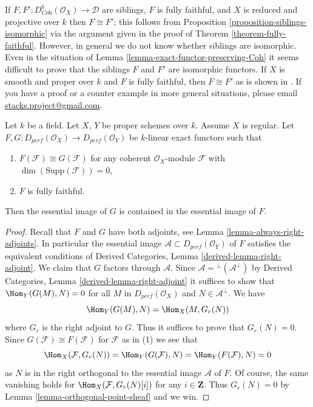 \begin{remark}
\label{remark-difficult}
If $F, F' : D^b_{\textit{Coh}}(\mathcal{O}_X) \to \mathcal{D}$ are siblings, $F$
is fully faithful, and $X$ is reduced and projective over $k$ then
$F \cong F'$; this follows from
Proposition \ref{proposition-siblings-isomorphic} via the argument
given in the proof of Theorem \ref{theorem-fully-faithful}.
However, in general we do not know whether siblings are isomorphic.
Even in the situation of Lemma \ref{lemma-exact-functor-preserving-Coh}
it seems difficult to prove that the siblings $F$ and $F'$
are isomorphic functors. If $X$ is smooth and proper over $k$
and $F$ is fully faithful, then $F \cong F'$ as is shown in
\cite{Noah}.
If you have a proof or a counter example in more general situations,
please email
\href{mailto:stacks.project@gmail.com}{stacks.project@gmail.com}.
\end{remark}

\begin{lemma}
\label{lemma-two-functors-pre}
Let $k$ be a field. Let $X$, $Y$ be proper schemes over $k$. Assume
$X$ is regular. Let
$F, G : D_{perf}(\mathcal{O}_X) \to D_{perf}(\mathcal{O}_Y)$
be $k$-linear exact functors such that
\begin{enumerate}
\item $F(\mathcal{F}) \cong G(\mathcal{F})$ for any coherent
$\mathcal{O}_X$-module $\mathcal{F}$ with $\dim(\text{Supp}(\mathcal{F})) = 0$,
\item $F$ is fully faithful.
\end{enumerate}
Then the essential image of $G$ is contained in the essential
image of $F$.
\end{lemma}

\begin{proof}
Recall that $F$ and $G$ have both adjoints, see
Lemma \ref{lemma-always-right-adjoints}. In particular
the essential image $\mathcal{A} \subset D_{perf}(\mathcal{O}_Y)$ of $F$
satisfies the equivalent conditions of
Derived Categories, Lemma \ref{derived-lemma-right-adjoint}.
We claim that $G$ factors through $\mathcal{A}$.
Since $\mathcal{A} = {}^\perp(\mathcal{A}^\perp)$ by
Derived Categories, Lemma \ref{derived-lemma-right-adjoint}
it suffices to show that $\Hom_Y(G(M), N) = 0$ for
all $M$ in $D_{perf}(\mathcal{O}_X)$ and $N \in \mathcal{A}^\perp$.
We have
$$
\Hom_Y(G(M), N) = \Hom_X(M, G_r(N))
$$
where $G_r$ is the right adjoint to $G$. Thus it suffices to prove
that $G_r(N) = 0$. Since
$G(\mathcal{F}) \cong F(\mathcal{F})$ for $\mathcal{F}$ as in (1)
we see that
$$
\Hom_X(\mathcal{F}, G_r(N)) =
\Hom_Y(G(\mathcal{F}), N) =
\Hom_Y(F(\mathcal{F}), N) = 0
$$
as $N$ is in the right orthogonal to the essential image $\mathcal{A}$ of $F$.
Of course, the same vanishing holds for $\Hom_X(\mathcal{F}, G_r(N)[i])$
for any $i \in \mathbf{Z}$. Thus $G_r(N) = 0$ by
Lemma \ref{lemma-orthogonal-point-sheaf} and we win.
\end{proof}


